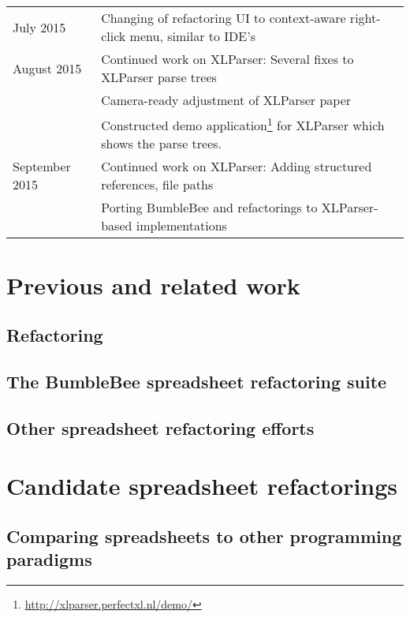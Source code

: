 \documentclass[12pt,a4paper,onecolumn,oneside,parskip]{memoir}
\begin{document}
\begin{tabularx}{\textwidth}{lX}
July 2015 & Changing of refactoring UI to context-aware right-click menu, similar to IDE's \\
August 2015 & Continued work on XLParser: Several fixes to XLParser parse trees \\
& Camera-ready adjustment of XLParser paper \\
& Constructed demo application\footnote{\url{http://xlparser.perfectxl.nl/demo/}} for XLParser which shows the parse trees. \\
September 2015 & Continued work on XLParser: Adding structured references, file paths \\
& Porting BumbleBee and refactorings to XLParser-based implementations \\
\bottomrule
\end{tabularx}



\chapter{Previous and related work}
\label{chapter:previouswork}

\section{Refactoring}

\section{The BumbleBee spreadsheet refactoring suite}

\section{Other spreadsheet refactoring efforts}


\chapter{Candidate spreadsheet refactorings}
\label{chapter:candidaterefactorings}

\section{Comparing spreadsheets to other programming paradigms}
\end{document}
